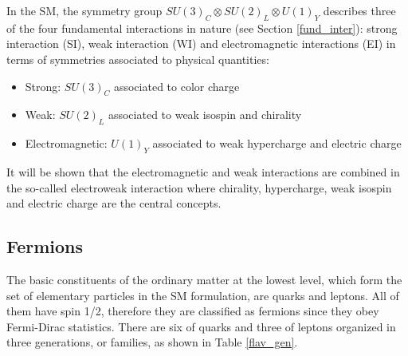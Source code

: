 In the SM, the symmetry group $SU(3)_C\otimes SU(2)_L\otimes U(1)_Y$ describes three of the four fundamental interactions in nature (see Section \ref{fund_inter}): strong interaction (SI), weak interaction (WI) and electromagnetic interactions (EI) in terms of symmetries associated to physical quantities:
\begin{itemize}
\item Strong: $SU(3)_C$ associated to color charge
\item Weak: $SU(2)_L$ associated to weak isospin and chirality
\item Electromagnetic: $U(1)_Y$ associated to weak hypercharge and electric charge
\end{itemize}

It will be shown that the electromagnetic and weak interactions are combined in the so-called electroweak interaction where chirality, hypercharge, weak isospin and electric charge are the central concepts.

\subsection{Fermions}\label{fermions}

The basic constituents of the ordinary matter at the lowest level, which form the set of elementary particles in the SM formulation, are quarks and leptons. All of them have spin 1/2, therefore they are classified as fermions since they obey Fermi-Dirac statistics. There are six  of quarks and three of leptons organized in three generations, or families, as shown in Table \ref{flav_gen}.
 

